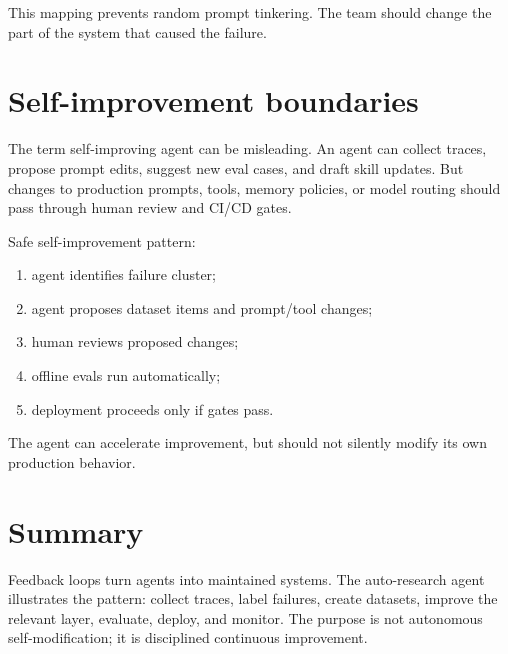 This mapping prevents random prompt tinkering. The team should change the part of the system that caused the failure.

\section{Self-improvement boundaries}

The term self-improving agent can be misleading. An agent can collect traces, propose prompt edits, suggest new eval cases, and draft skill updates. But changes to production prompts, tools, memory policies, or model routing should pass through human review and CI/CD gates.

Safe self-improvement pattern:

\begin{enumerate}[leftmargin=*]
  \item agent identifies failure cluster;
  \item agent proposes dataset items and prompt/tool changes;
  \item human reviews proposed changes;
  \item offline evals run automatically;
  \item deployment proceeds only if gates pass.
\end{enumerate}

The agent can accelerate improvement, but should not silently modify its own production behavior.

\section{Summary}

Feedback loops turn agents into maintained systems. The auto-research agent illustrates the pattern: collect traces, label failures, create datasets, improve the relevant layer, evaluate, deploy, and monitor. The purpose is not autonomous self-modification; it is disciplined continuous improvement.
